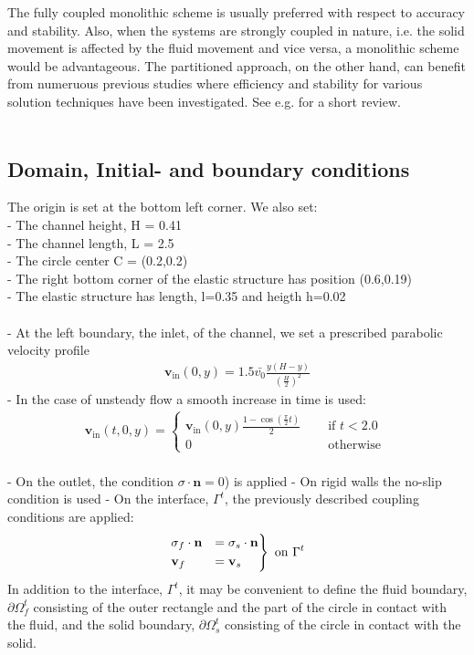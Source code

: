 The fully coupled monolithic scheme is usually preferred with respect to accuracy and stability. Also, when the systems are strongly coupled in nature, i.e. the solid movement is affected by the fluid movement and vice versa, a monolithic scheme would be advantageous. The partitioned approach, on the other hand, can benefit from numeruous previous studies where efficiency and stability for various solution techniques have been investigated. See e.g. \cite{Tang14} for a short review. 
\\
\\
\subsection{Domain, Initial- and boundary conditions}
The origin is set at the bottom left corner. We also set:
\\ - The channel height, H = 0.41
\\ - The channel length, L = 2.5
\\ - The circle center C = (0.2,0.2)
\\ - The right bottom corner of the elastic structure has position (0.6,0.19) 
\\ - The elastic structure has length, l=0.35 and heigth h=0.02
\\
\\
- At the left boundary, the inlet, of the channel, we set a prescribed parabolic velocity profile
\begin{align}
\mathbf{v}_{\text{in}}(0,y) = 1.5\bar{v_0}\frac{y(H-y)}{(\frac{H}{2})^2}
\end{align}
- In the case of unsteady flow a smooth increase in time is used:
\begin{align}
 \mathbf{v}_{\text{in}}(t,0,y)= \begin{cases}
				\mathbf{v}_{\text{in}}(0,y)\frac{1-\cos(\frac{\pi}{2}t)}{2} & \quad \text{ if } t<2.0 \\
				0 & \quad  \text{ otherwise }
		 		\end{cases}
\end{align}
\\
- On the outlet, the condition $\sigma \cdot \mathbf{n} = 0$) is applied
- On rigid walls the no-slip condition is used
- On the interface, $\Gamma^t$, the previously described coupling conditions are applied:
\begin{align}
\begin{rcases}
\sigma_f \cdot \mathbf{n} & =  \sigma_s \cdot \mathbf{n} \\
\mathbf{v}_f & = \mathbf{v}_s
\end{rcases}
\text{ on } \Gamma^t
\end{align}
In addition to the interface, $\Gamma^t$, it may be convenient to define the fluid boundary, $\partial \Omega_f^t$ consisting of the outer rectangle and the part of the circle in contact with the fluid, and the solid boundary, $\partial \Omega_s^t$ consisting of the circle in contact with the solid.
